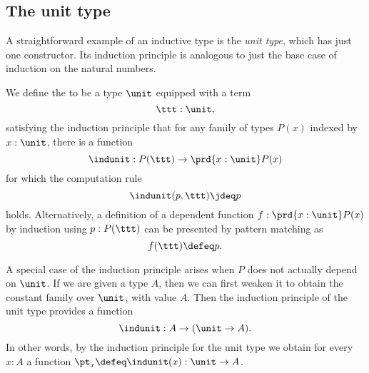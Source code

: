 \subsection{The unit type}
A straightforward example of an inductive type is the \emph{unit type}, which has just one constructor. 
Its induction principle is analogous to just the base case of induction on the natural numbers.

\begin{defn}
We define the  to be a type $\unit$ equipped with a term
\begin{equation*}
\ttt:\unit,
\end{equation*}
satisfying the induction principle that for any family of types $P(x)$ indexed by $x:\unit$, there is a function
\begin{equation*}
\indunit : P(\ttt)\to\prd{x:\unit}P(x)
\end{equation*}
for which the computation rule
\begin{equation*}
\indunit(p,\ttt) \jdeq p
\end{equation*}
holds. Alternatively, a definition of a dependent function $f:\prd{x:\unit}P(x)$ by induction using $p:P(\ttt)$ can be presented by pattern matching as
\begin{equation*}
  f(\ttt)\defeq p.
\end{equation*}
\end{defn}

A special case of the induction principle arises when $P$ does not actually depend on $\unit$. If we are given a type $A$, then we can first weaken it to obtain the constant family over $\unit$, with value $A$. Then the induction principle of the unit type provides a function
\begin{equation*}
  \indunit : A \to (\unit\to A).
\end{equation*}
In other words, by the induction principle for the unit type we obtain for every $x:A$ a function $\pt_x\defeq\indunit(x):\unit\to A$.

